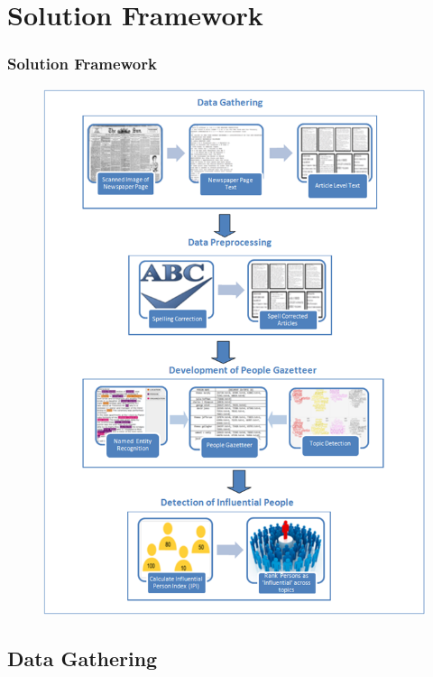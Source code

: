 \documentclass{beamer}
\begin{document}
\section{Solution Framework}
\begin{frame}

\frametitle{Solution Framework}
\begin{figure}[ht]
\begin{center}
\includegraphics[scale=0.35]{images/framework3.png}
\end{center}
\end{figure}

\end{frame}

\subsection{Data Gathering}
\end{document}
